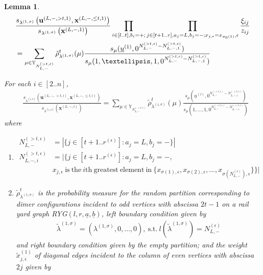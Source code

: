 \documentclass[10pt,a4paper]{amsart}
\newtheorem{lemma}{Lemma}
\newcommand\YY{\mathbb{Y}}
\newcommand\si{\sigma}
\begin{document}
\begin{lemma}\label{l46}
\begin{align}
&\frac{s_{\lambda^{(1,\sigma)}}\left(\mathbf{u}^{(L,-,>t,1)},\mathbf{x}^{(L,-,\leq t,1)}\right)}{s_{\lambda^{(1,\sigma)}}\left(\mathbf{x}^{(L,-,1)}\right)}
\prod_{i\in[l..t],b_i=+;}\prod_{j\in[t+1..r],a_j=L,b_j=-;x_{j,\epsilon}=x_{\si_0(1)},\epsilon}\frac{\xi_{ij}}{z_{ij}}\label{e461}\\
&=\sum_{\mu\in \YY_{N_{L,-}^{(>t,\epsilon)}}}\tilde{\rho}^t_{\lambda^{(1,\si)}}(\mu)
\frac{s_{\mu}(\underline{u}^{(1)},0^{N_{L,-}^{(>t,\epsilon)}-N_{L,-,1}^{(>t,\epsilon)}})}{s_{\mu}(1,\ldots,1,0^{N_{L,-}^{(>t,\epsilon)}-N_{L,-,1}^{(>t,\epsilon)}})}\notag
\end{align}

For each $i\in[2..n]$,
\begin{align}
&\frac{s_{\lambda^{(i,\sigma)}}\left(\mathbf{u}^{(L,-,>t,i)},\mathbf{x}^{(L,-,\leq t,i)}\right)}{s_{\lambda^{(i,\sigma)}}\left(\mathbf{x}^{(L,-,i)}\right)}=\sum_{\mu\in\YY_{N_{L,-}^{(>t,\epsilon)}}}\tilde{\rho}^{t}_{\lambda^{(i,\si)}}(\mu)\frac{s_{\mu}(\underline{u}^{(i)},0^{N_{L,-}^{(>t,\epsilon)}-N_{L,-,i}^{(>t,\epsilon)}})}{s_{\mu}(1,\ldots,1,0^{N_{L,-}^{(>t,\epsilon)}-N_{L,-,i}^{(>t,\epsilon)}})}\label{e462}
\end{align}
where  
\begin{enumerate}
\item 
\begin{align*}
N_{L,-}^{(>t,\epsilon)}&=|\{j\in [t+1..r^{(\epsilon)}]:a_j=L,b_j=-\}|\\
N_{L,-,i}^{(>t,\epsilon)}&=|\{j\in [t+1..r^{(\epsilon)}]:a_j=L,b_j=-,\\
&x_{j,\epsilon}\ \mathrm{is\ the}\ i\mathrm{th}\ \mathrm{greatest\ element\ in}\ \{x_{\si(1),\epsilon},x_{\si(2),\epsilon},\ldots,x_{\si(N_{L,-}^{(\epsilon)}),\epsilon}\}\}|
\end{align*}
\item $\tilde{\rho}^{t}_{\lambda^{(1,\si)}}$ is the probability measure for the random partition corresponding to dimer configurations incident to odd vertices with abscissa $2t-1$ on a rail yard graph RYG$(l,r,\underline{a},\underline{b})$, left boundary condition given by 
\begin{align*}
\tilde{\lambda}^{(1,\si)}=(\lambda^{(1,\si)},0,\ldots,0),\ \mathrm{s.t.}\ l(\tilde{\lambda}^{(1,\si)})=N_{L,-}^{(\epsilon
)}
\end{align*}
and right boundary condition given by the empty partition; and the weight $\tilde{x}_{j,\epsilon}^{(1)}$ of diagonal edges incident to the column of even vertices with abscissa $2j$ given by

\end{enumerate}
\end{lemma}
\end{document}
